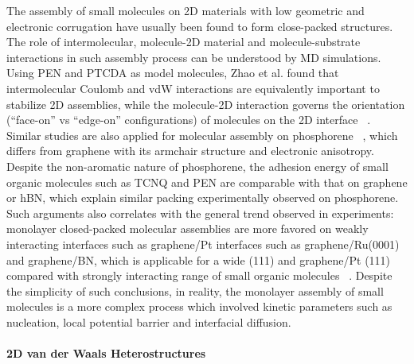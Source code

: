 The assembly of small molecules on 2D materials with low geometric and
electronic corrugation have usually been found to form close-packed
structures. The role of intermolecular, molecule-2D material and
molecule-substrate interactions in such assembly process can be
understood by MD simulations. Using PEN and PTCDA as model molecules,
Zhao et al. found that inter\-molecular Coulomb and vdW interactions
are equivalently important to stabilize 2D assemblies, while the
molecule-2D interaction governs the orientation (\ie ``face-on'' vs
``edge-on'' configurations) of molecules on the 2D interface
~\cite{Zhao_2015_self_assemb_gr_MD}. Similar studies are also applied
for molecular assembly on phosphorene
~\cite{Mukhopadhyay_2017_cryst_BP}, which differs from graphene with
its armchair structure and electronic anisotropy. Despite the
non-aromatic nature of phosphorene, the adhesion energy of small
organic molecules such as TCNQ and PEN are comparable with that on
graphene or hBN, which explain similar packing experimentally observed
on phosphorene. Such arguments also correlates with the general trend
observed in experiments: monolayer closed-packed molecular assemblies
are more favored on weakly interacting interfaces such as graphene/Pt
interfaces such as graphene/\allowbreak{}Ru(0001) and graphene/BN, which is applicable for a wide
(111) and graphene/Pt (111) compared with strongly interacting
range of small organic molecules ~\cite{Hamalainen_2012_CoPc_gr_Ir,Xiao_2013_jacs_CuPc_gr,Barja_2010_TCNQ_gr, Jung_2014_C60_gr_Cu,Yang_2012_MPc_gr_metal,Barja_2010_TCNQ_gr,Hamalainen_2012_CoPc_gr_Ir,Tsai_2015_TCNQ_gr_hbn,Stradi_2014_TCNQ_gr_Ru}.
%
Despite the simplicity of such conclusions, in reality, the monolayer
assembly of small molecules is a more complex process which involved
kinetic parameters such as nucleation, local potential barrier and
interfacial diffusion.


\paragraph{2D van der Waals Heterostructures}
\label{sec:org77ea5bc}

